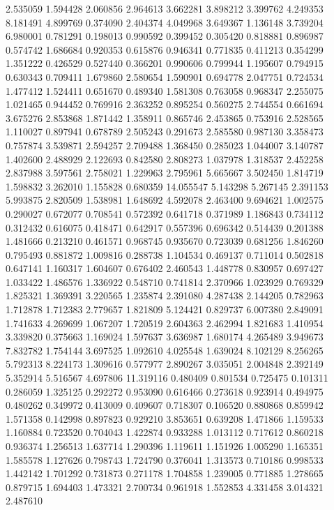 2.535059
1.594428
2.060856
2.964613
3.662281
3.898212
3.399762
4.249353
8.181491
4.899769
0.374090
2.404374
4.049968
3.649367
1.136148
3.739204
6.980001
0.781291
0.198013
0.990592
0.399452
0.305420
0.818881
0.896987
0.574742
1.686684
0.920353
0.615876
0.946341
0.771835
0.411213
0.354299
1.351222
0.426529
0.527440
0.366201
0.990606
0.799944
1.195607
0.794915
0.630343
0.709411
1.679860
2.580654
1.590901
0.694778
2.047751
0.724534
1.477412
1.524411
0.651670
0.489340
1.581308
0.763058
0.968347
2.255075
1.021465
0.944452
0.769916
2.363252
0.895254
0.560275
2.744554
0.661694
3.675276
2.853868
1.871442
1.358911
0.865746
2.453865
0.753916
2.528565
1.110027
0.897941
0.678789
2.505243
0.291673
2.585580
0.987130
3.358473
0.757874
3.539871
2.594257
2.709488
1.368450
0.285023
1.044007
3.140787
1.402600
2.488929
2.122693
0.842580
2.808273
1.037978
1.318537
2.452258
2.837988
3.597561
2.758021
1.229963
2.795961
5.665667
3.502450
1.814719
1.598832
3.262010
1.155828
0.680359
14.055547
5.143298
5.267145
2.391153
5.993875
2.820509
1.538981
1.648692
4.592078
2.463400
9.694621
1.002575
0.290027
0.672077
0.708541
0.572392
0.641718
0.371989
1.186843
0.734112
0.312432
0.616075
0.418471
0.642917
0.557396
0.696342
0.514439
0.201388
1.481666
0.213210
0.461571
0.968745
0.935670
0.723039
0.681256
1.846260
0.795493
0.881872
1.009816
0.288738
1.104534
0.469137
0.711014
0.502818
0.647141
1.160317
1.604607
0.676402
2.460543
1.448778
0.830957
0.697427
1.033422
1.486576
1.336922
0.548710
0.741814
2.370966
1.023929
0.769329
1.825321
1.369391
3.220565
1.235874
2.391080
4.287438
2.144205
0.782963
1.712878
1.712383
2.779657
1.821809
5.124421
0.829737
6.007380
2.849091
1.741633
4.269699
1.067207
1.720519
2.604363
2.462994
1.821683
1.410954
3.339820
0.375663
1.169024
1.597637
3.636987
1.680174
4.265489
3.949673
7.832782
1.754144
3.697525
1.092610
4.025548
1.639024
8.102129
8.256265
5.792313
8.224173
1.309616
0.577977
2.890267
3.035051
2.004848
2.392149
5.352914
5.516567
4.697806
11.319116
0.480409
0.801534
0.725475
0.101311
0.286059
1.325125
0.292272
0.953090
0.616466
0.273618
0.923914
0.494975
0.480262
0.349972
0.413009
0.409607
0.718307
0.106520
0.880868
0.859942
1.571358
0.142998
0.897823
0.929210
3.853651
0.639208
1.471866
1.159533
1.160884
0.723520
0.704043
1.422874
0.933288
1.013112
0.717612
0.860218
0.936374
1.256513
1.637714
1.290396
1.119611
1.151926
1.005290
1.165351
1.585578
1.127626
0.798743
1.724790
0.376041
1.313573
0.710186
0.998533
1.442142
1.701292
0.731873
0.271178
1.704858
1.239005
0.771885
1.278665
0.879715
1.694403
1.473321
2.700734
0.961918
1.552853
4.331458
3.014321
2.487610
